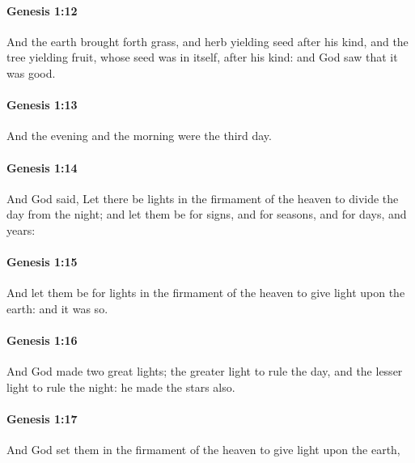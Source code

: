 		\paragraph{Genesis 1:12} %
			\label{GENESIS-1-12}

			And the earth brought forth grass, and herb yielding seed after his kind, and the tree yielding fruit, whose seed was in itself, after his kind: and God saw that it was good. 

		\paragraph{Genesis 1:13} %
			\label{GENESIS-1-13}

			And the evening and the morning were the third day.

		\paragraph{Genesis 1:14} %
			\label{GENESIS-1-14}

			And God said, Let there be lights in the firmament of the heaven to divide the day from the night; and let them be for signs, and for seasons, and for days, and years: 

		\paragraph{Genesis 1:15} %
			\label{GENESIS-1-15}

			And let them be for lights in the firmament of the heaven to give light upon the earth: and it was so. 

		\paragraph{Genesis 1:16} %
			\label{GENESIS-1-16}

			And God made two great lights; the greater light to rule the day, and the lesser light to rule the night: he made the stars also. 

		\paragraph{Genesis 1:17} %
			\label{GENESIS-1-17}

			And God set them in the firmament of the heaven to give light upon the earth, 

